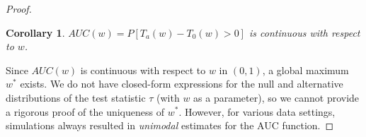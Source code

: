\documentclass[12pt]{article} %
\newtheorem{cor}{Corollary}
\begin{document}
\begin{proof}

\begin{cor}{
 $AUC(w)=P\left[T_a(w)-T_0(w) >0 \right]$ is continuous with respect to $w$.}
\end{cor}

Since $AUC(w)$ is continuous with respect to $w$ in $(0,1)$, a global maximum $w^*$ exists. We do not have closed-form expressions for the null and alternative distributions of the test statistic $\tau$ (with $w$ as a parameter), so we cannot provide a rigorous proof of the uniqueness of $w^*$. However, for various data settings, simulations always resulted in \emph{unimodal}  estimates for the AUC function.

\end{proof}
\end{document}
